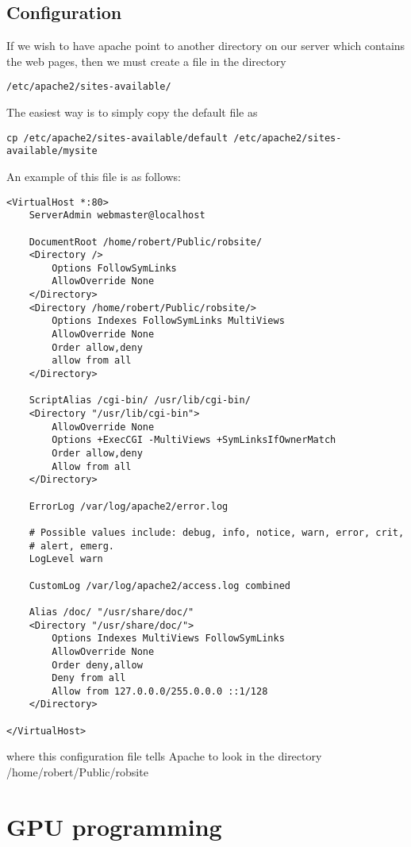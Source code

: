 \documentclass[a4paper, 10pt]{article}
\begin{document}
\subsection*{Configuration}
\label{sec:configuration}

If we wish to have apache point to another directory on our server
which contains the web pages, then we must create a file in the
directory
\begin{verbatim}
/etc/apache2/sites-available/
\end{verbatim}
The easiest way is to simply copy the default file as
\begin{verbatim}
cp /etc/apache2/sites-available/default /etc/apache2/sites-available/mysite
\end{verbatim}

An example of this file is as follows:
\begin{verbatim}
<VirtualHost *:80>
	ServerAdmin webmaster@localhost

	DocumentRoot /home/robert/Public/robsite/
	<Directory />
		Options FollowSymLinks
		AllowOverride None
	</Directory>
	<Directory /home/robert/Public/robsite/>
		Options Indexes FollowSymLinks MultiViews
		AllowOverride None
		Order allow,deny
		allow from all
	</Directory>

	ScriptAlias /cgi-bin/ /usr/lib/cgi-bin/
	<Directory "/usr/lib/cgi-bin">
		AllowOverride None
		Options +ExecCGI -MultiViews +SymLinksIfOwnerMatch
		Order allow,deny
		Allow from all
	</Directory>

	ErrorLog /var/log/apache2/error.log

	# Possible values include: debug, info, notice, warn, error, crit,
	# alert, emerg.
	LogLevel warn

	CustomLog /var/log/apache2/access.log combined

    Alias /doc/ "/usr/share/doc/"
    <Directory "/usr/share/doc/">
        Options Indexes MultiViews FollowSymLinks
        AllowOverride None
        Order deny,allow
        Deny from all
        Allow from 127.0.0.0/255.0.0.0 ::1/128
    </Directory>

</VirtualHost>
\end{verbatim}
where this configuration file tells Apache to look in the directory /home/robert/Public/robsite

\section*{GPU programming}
\end{document}
